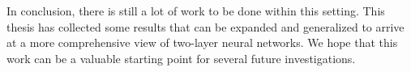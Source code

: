 In conclusion, there is still a lot of work to be done within this setting.
This thesis has collected some results that can be expanded and generalized to arrive at a more comprehensive view of two-layer neural networks.
We hope that this work can be a valuable starting point for several future investigations.